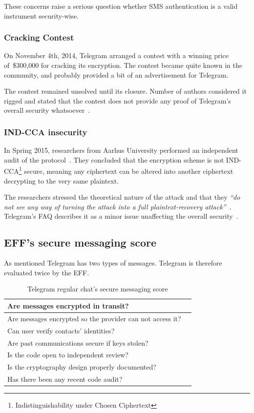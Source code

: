 \documentclass[thesis=M,english]{FITthesis}[2012/10/20]
\newcommand{\cmark}{\ding{51}}%
\newcommand{\xmark}{\ding{55}}%
\begin{document}
These concerns raise a serious question whether SMS authentication is a valid instrument security-wise.

\subsubsection{Cracking Contest}

On November 4th, 2014, Telegram arranged a contest with a winning price of~\$300,000 for cracking its encryption. The contest became quite known in the community, and probably provided a bit of an advertisement for Telegram.

The contest remained unsolved until its closure. Number of authors considered it rigged and stated that the contest does not provide any proof of Telegram's overall security whatsoever~\cite{telegramcontestfail,telegramcontestfail2}.

\subsubsection{IND-CCA insecurity}

In Spring 2015, researchers from Aarhus University performed an independent audit of the protocol~\cite{telegram-aarhus}. They concluded that the encryption scheme is not IND-CCA\footnote{Indistinguishability under Chosen Ciphertext} secure, meaning any ciphertext can be altered into another ciphertext decrypting to the very same plaintext.

The researchers stressed the theoretical nature of the attack and that they \emph{``do not see any way of turning the attack into a full plaintext-recovery attack''}~\cite{telegram-aarhus}. Telegram's FAQ describes it as a minor issue unaffecting the overall security~\cite{telegram-techfaq}.


\subsection{EFF's secure messaging score}

As mentioned Telegram has two types of messages. Telegram is therefore evaluated twice by the EFF.

\begin{table}[H]
	\centering
	\caption{Telegram regular chat's secure messaging score}
	\label{tab:telegram-regular-eff}
	\begin{tabular}{|l|l|}
		\hline
		Are messages encrypted in transit? & \cmark \\\hline
		Are messages encrypted so the provider can not access it? & \xmark \\ \hline
		Can user verify contacts' identities? & \xmark \\ \hline
		Are past communications secure if keys stolen? & \xmark \\ \hline
		Is the code open to independent review? & \xmark \\ \hline
		Is the cryptography design properly documented? & \cmark \\ \hline
		Has there been any recent code audit? & \cmark \\ \hline
	\end{tabular}
\end{table}
\end{document}

